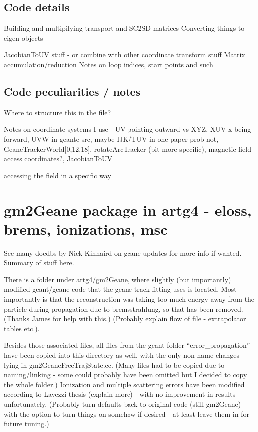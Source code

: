 \documentclass{article}
\begin{document}
\subsection{Code details}

Building and multipilying transport and SC2SD matrices
Converting things to eigen objects

JacobianToUV stuff - or combine with other coordinate transform stuff
Matrix accumulation/reduction
Notes on loop indices, start points and such



\subsection{Code peculiarities / notes}

Where to structure this in the file?

Notes on coordinate systems I use - UV pointing outward vs XYZ, XUV x being forward, UVW in geante src, maybe IJK/TUV in one paper-prob not, GeaneTrackerWorld[0,12,18], rotateArcTracker (bit more specific), magnetic field access coordinates?, JacobianToUV

accessing the field in a specific way







\section{gm2Geane package in artg4 - eloss, brems, ionizations, msc}

See many docdbs by Nick Kinnaird on geane updates for more info if wanted. Summary of stuff here.


  There is a folder under artg4/gm2Geane, where slightly (but importantly) modified geant/geane code that the geane track fitting uses is located. Most importantly is that the reconstruction was taking too much energy away from the particle during propagation due to bremsstrahlung, so that has been removed. (Thanks James for help with this.) (Probably explain flow of file - extrapolator tables etc.).

  Besides those associated files, all files from the geant folder ``error\_propagation'' have been copied into this directory as well, with the only non-name changes lying in gm2GeaneFreeTrajState.cc. (Many files had to be copied due to naming/linking - some could probably have been omitted but I decided to copy the whole folder.) Ionization and multiple scattering errors have been modified according to Lavezzi thesis (explain more) - with no improvement in results unfortunately. (Probably turn defaults back to original code (still gm2Geane) with the option to turn things on somehow if desired - at least leave them in for future tuning.)
\end{document}
